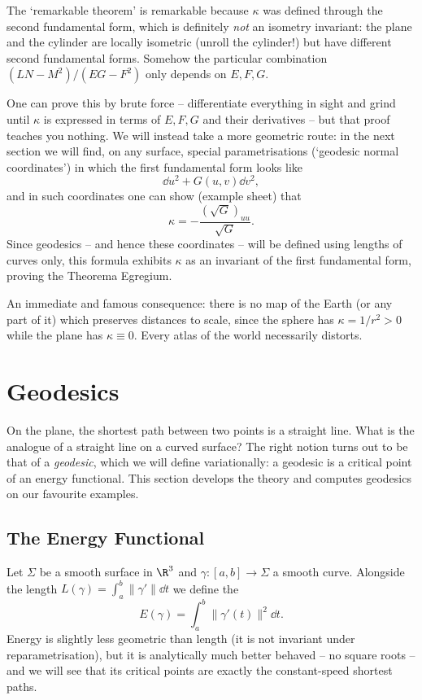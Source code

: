 The `remarkable theorem' is remarkable because $\kappa$ was defined through the second fundamental form, which is definitely \emph{not} an isometry invariant: the plane and the cylinder are locally isometric (unroll the cylinder!) but have different second fundamental forms. Somehow the particular combination $(LN - M^2)/(EG - F^2)$ only depends on $E, F, G$.

One can prove this by brute force -- differentiate everything in sight and grind until $\kappa$ is expressed in terms of $E, F, G$ and their derivatives -- but that proof teaches you nothing. We will instead take a more geometric route: in the next section we will find, on any surface, special parametrisations (`geodesic normal coordinates') in which the first fundamental form looks like
$$
\dd u^2 + G(u,v) \dd v^2,
$$
and in such coordinates one can show (example sheet) that
$$
\kappa = -\frac{(\sqrt{G})_{uu}}{\sqrt{G}}.
$$
Since geodesics -- and hence these coordinates -- will be defined using lengths of curves only, this formula exhibits $\kappa$ as an invariant of the first fundamental form, proving the Theorema Egregium.

An immediate and famous consequence: there is no map of the Earth (or any part of it) which preserves distances to scale, since the sphere has $\kappa = 1/r^2 > 0$ while the plane has $\kappa \equiv 0$. Every atlas of the world necessarily distorts.

\section{Geodesics}

On the plane, the shortest path between two points is a straight line. What is the analogue of a straight line on a curved surface? The right notion turns out to be that of a \emph{geodesic}, which we will define variationally: a geodesic is a critical point of an energy functional. This section develops the theory and computes geodesics on our favourite examples.

\subsection{The Energy Functional}

Let $\Sigma$ be a smooth surface in $\R^3$ and $\gamma: [a, b] \rightarrow \Sigma$ a smooth curve. Alongside the length $L(\gamma) = \int_a^b \|\gamma'\|\dd t$ we define the 
$$
E(\gamma) = \int_a^b \|\gamma'(t)\|^2 \dd t.
$$
Energy is slightly less geometric than length (it is not invariant under reparametrisation), but it is analytically much better behaved -- no square roots -- and we will see that its critical points are exactly the constant-speed shortest paths.

